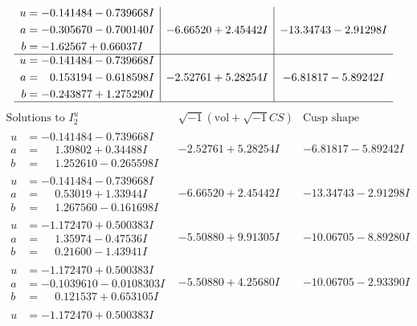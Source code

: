 \documentclass[1p]{elsarticle_modified}
\theoremstyle{definition}
\newcommand{\I}{\sqrt{-1}}
\begin{document}
$$\begin{array}{c|c|c}
\begin{aligned}
u &= -0.141484 - 0.739668 I \\
a &= -0.305670 - 0.700140 I \\
b &= -1.62567 + 0.66037 I\end{aligned}
 & -6.66520 + 2.45442 I & -13.34743 - 2.91298 I \\ \hline\begin{aligned}
u &= -0.141484 - 0.739668 I \\
a &= \phantom{-}0.153194 - 0.618598 I \\
b &= -0.243877 + 1.275290 I\end{aligned}
 & -2.52761 + 5.28254 I & -6.81817 - 5.89242 I\\
 \hline 
 \end{array}$$\newpage$$\begin{array}{c|c|c}  
\text{Solutions to }I^u_{2}& \I (\text{vol} + \sqrt{-1}CS) & \text{Cusp shape}\\
 \hline 
\begin{aligned}
u &= -0.141484 - 0.739668 I \\
a &= \phantom{-}1.39802 + 0.34488 I \\
b &= \phantom{-}1.252610 - 0.265598 I\end{aligned}
 & -2.52761 + 5.28254 I & -6.81817 - 5.89242 I \\ \hline\begin{aligned}
u &= -0.141484 - 0.739668 I \\
a &= \phantom{-}0.53019 + 1.33944 I \\
b &= \phantom{-}1.267560 - 0.161698 I\end{aligned}
 & -6.66520 + 2.45442 I & -13.34743 - 2.91298 I \\ \hline\begin{aligned}
u &= -1.172470 + 0.500383 I \\
a &= \phantom{-}1.35974 - 0.47536 I \\
b &= \phantom{-}0.21600 - 1.43941 I\end{aligned}
 & -5.50880 + 9.91305 I & -10.06705 - 8.89280 I \\ \hline\begin{aligned}
u &= -1.172470 + 0.500383 I \\
a &= -0.1039610 - 0.0108303 I \\
b &= \phantom{-}0.121537 + 0.653105 I\end{aligned}
 & -5.50880 + 4.25680 I & -10.06705 - 2.93390 I \\ \hline\begin{aligned}
u &= -1.172470 + 0.500383 I \\

\end{aligned}
\end{array}$$
\end{document}
